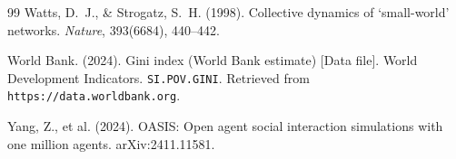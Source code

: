 \documentclass[12pt, letterpaper]{article}
\begin{document}
\begin{thebibliography}{99}
Watts, D.~J., \& Strogatz, S.~H. (1998).
Collective dynamics of `small-world' networks.
\textit{Nature}, 393(6684), 440--442.

World Bank. (2024).
Gini index (World Bank estimate) [Data file].
World Development Indicators. \texttt{SI.POV.GINI}.
Retrieved from \texttt{https://data.worldbank.org}.

Yang, Z., et al. (2024).
OASIS: Open agent social interaction simulations with one million agents.
arXiv:2411.11581.

\end{thebibliography}
\end{document}
